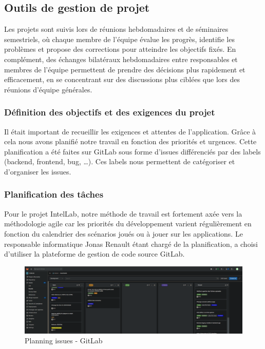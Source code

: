 \subsection{Outils de gestion de projet}

Les projets sont suivis lors de réunions hebdomadaires et de séminaires semestriels, où chaque membre de l'équipe évalue les progrès, identifie les problèmes et propose des corrections pour atteindre les objectifs fixés.
En complément, des échanges bilatéraux hebdomadaires entre responsables et membres de l'équipe permettent de prendre des décisions plus rapidement et efficacement, en se concentrant sur des discussions plus ciblées que lors des réunions d'équipe générales.

\subsubsection{Définition des objectifs et des exigences du projet}

Il était important de recueillir les exigences et attentes de l’application.
Grâce à cela nous avons planifié notre travail en fonction des priorités et urgences. Cette planification a été faites sur GitLab sous forme d’issues différenciés par des labels (backend, frontend, bug, …).
Ces labels nous permettent de catégoriser et d'organiser les issues.

\subsubsection{Planification des tâches}

Pour le projet IntelLab, notre méthode de travail est fortement axée vers la méthodologie agile car les priorités du développement varient régulièrement en fonction du calendrier des scénarios joués ou à jouer sur les applications.
Le responsable informatique Jonas Renault étant chargé de la planification, a choisi d'utiliser la plateforme de gestion de code source GitLab.

\begin{figure}[h]
	\center
	\includegraphics[width=\textwidth]{./images/gitlab_intellab.PNG}
	\caption[Planification des issues]{Planning issues - GitLab}\label{fig:gitlab_intellab}
\end{figure}

